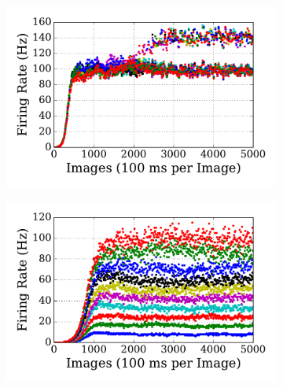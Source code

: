 \begin{figure}
\begin{subfigure}[t]{0.48\textwidth}
		\caption{}
	\end{subfigure}
	\begin{subfigure}[t]{0.48\textwidth}
		\includegraphics[width=\textwidth]{pics_sdlm/10_exp_SRBM_Orig/exp1_recon_s.pdf}
		\caption{}
	\end{subfigure}
	\begin{subfigure}[t]{0.48\textwidth}
		\includegraphics[width=\textwidth]{pics_sdlm/10_exp_SRBM_Orig/exp2_recon_s.pdf}
		\caption{}
	\end{subfigure}\\
	\begin{subfigure}[t]{0.48\textwidth}

\end{subfigure}
\end{figure}
